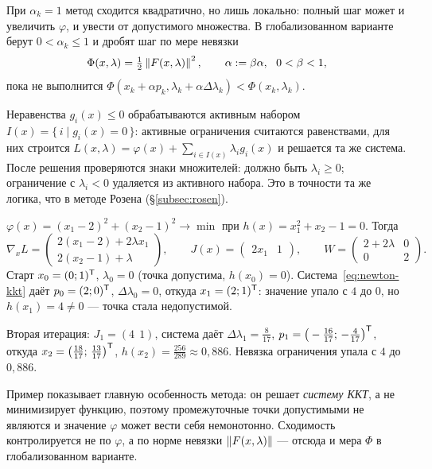 \begin{idea}[title={Глобализация и неравенства}]
При $\alpha_k = 1$ метод сходится квадратично, но лишь локально: полный шаг
может и увеличить $\varphi$, и увести от допустимого множества. В
глобализованном варианте берут $0 < \alpha_k \le 1$ и дробят шаг по мере
невязки
\[
  \Phi(x,\lambda) = \tfrac12 \left\lVert F(x,\lambda) \right\rVert^2 ,
  \qquad
  \alpha := \beta\alpha, \ \ 0 < \beta < 1 ,
\]
пока не выполнится $\Phi(x_k + \alpha p_k, \lambda_k + \alpha\Delta\lambda_k)
< \Phi(x_k,\lambda_k)$.

Неравенства $g_i(x) \le 0$ обрабатываются активным набором
$I(x) = \{\, i \mid g_i(x) = 0 \,\}$: активные ограничения считаются
равенствами, для них строится $L(x,\lambda) = \varphi(x)
+ \sum_{i \in I(x)} \lambda_i g_i(x)$ и решается та же система. После решения
проверяются знаки множителей: должно быть $\lambda_i \ge 0$; ограничение с
$\lambda_i < 0$ удаляется из активного набора. Это в точности та же логика,
что в методе Розена (\S\ref{subsec:rosen}).
\end{idea}

\begin{example}
$\varphi(x) = (x_1-2)^2 + (x_2-1)^2 \to \min$ при $h(x) = x_1^2 + x_2 - 1 = 0$.
Тогда
\[
  \nabla_x L = \begin{pmatrix} 2(x_1-2) + 2\lambda x_1 \\ 2(x_2-1)+\lambda \end{pmatrix} ,
  \qquad
  J(x) = \begin{pmatrix} 2x_1 & 1 \end{pmatrix} ,
  \qquad
  W = \begin{pmatrix} 2+2\lambda & 0 \\ 0 & 2 \end{pmatrix} .
\]
Старт $x_0 = (0;1)^{\mathsf{T}}$, $\lambda_0 = 0$ (точка допустима, $h(x_0) = 0$).
Система~\eqref{eq:newton-kkt} даёт $p_0 = (2;0)^{\mathsf{T}}$, $\Delta\lambda_0 = 0$,
откуда $x_1 = (2;1)^{\mathsf{T}}$: значение упало с $4$ до $0$, но
$h(x_1) = 4 \ne 0$ — точка стала недопустимой.

Вторая итерация: $J_1 = (4\ \ 1)$, система даёт
$\Delta\lambda_1 = \tfrac{8}{17}$, $p_1 = \big(-\tfrac{16}{17};\,-\tfrac{4}{17}\big)^{\mathsf{T}}$,
откуда $x_2 = \big(\tfrac{18}{17};\,\tfrac{13}{17}\big)^{\mathsf{T}}$,
$h(x_2) = \tfrac{256}{289} \approx 0{,}886$. Невязка ограничения упала с $4$ до
$0{,}886$.
\end{example}

\begin{idea}
Пример показывает главную особенность метода: он решает \emph{систему ККТ}, а
не минимизирует функцию, поэтому промежуточные точки допустимыми не являются и
значение $\varphi$ может вести себя немонотонно. Сходимость контролируется не
по $\varphi$, а по норме невязки $\left\lVert F(x,\lambda) \right\rVert$ — отсюда и мера
$\Phi$ в глобализованном варианте.
\end{idea}

